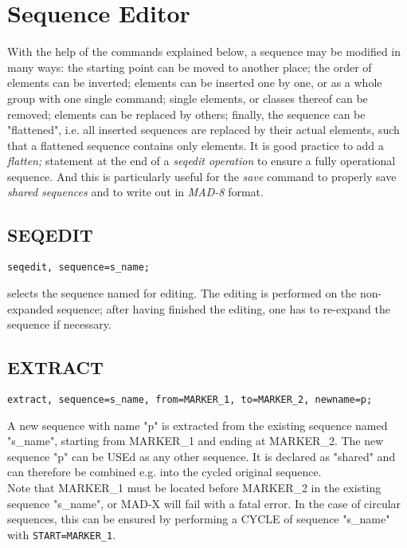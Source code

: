 
\chapter{Sequence Editor}
\label{chap:seqedit}
With the help of the commands explained below, a sequence may be
modified in many ways: the starting point can be moved to another place;
the order of elements can be inverted; elements can be inserted one by
one, or as a whole group with one single command; single elements, or
classes thereof can be removed; elements can be replaced by others;
finally, the sequence can be "flattened", i.e. all inserted sequences
are replaced by their actual elements, such that a flattened sequence
contains only elements. It is good practice to add a \textit{ flatten; }
statement at the end of a \textit{ seqedit operation } to ensure a fully
operational sequence. And this is particularly useful for the \textit{
  save } command to properly save \textit{ shared sequences } and to
write out in \textit{ MAD-8 } format.  


\section{SEQEDIT}
\begin{verbatim}
seqedit, sequence=s_name;
\end{verbatim} 
selects the sequence named for editing. The editing is performed on the
non-expanded sequence; after having finished the editing, one has to
re-expand the sequence if necessary.  

\section{EXTRACT}
\begin{verbatim}
extract, sequence=s_name, from=MARKER_1, to=MARKER_2, newname=p;
\end{verbatim} 
A new sequence with name "p" is extracted from the existing sequence named "s\_name", 
starting from MARKER\_1 and ending at MARKER\_2. The new sequence
"p" can be USEd as any other sequence. It is declared as "shared" and
can therefore be combined e.g. into the cycled original sequence. \\ 
Note that MARKER\_1 must be located before MARKER\_2 in the existing sequence "s\_name", 
or MAD-X will fail with a fatal error. 
In the case of circular sequences, this can be ensured by performing a CYCLE 
of sequence "s\_name" with {\tt START=MARKER\_1}.

